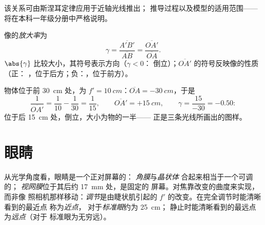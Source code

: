 \begin{remark}
该关系可由斯涅耳定律应用于近轴光线推出；
推导过程以及模型的适用范围——
将在本科一年级分册中严格说明。
\end{remark}

\begin{definition}[放大率]\label{def:g11:lenses-and-eye:magnification}
像的\emph{放大率}为
\[
\gamma = \frac{\overline{A'B'}}{\overline{AB}}
       = \frac{\overline{OA'}}{\overline{OA}} .
\]
$\abs{\gamma}$ 比较大小，其符号表示方向（$\gamma < 0$：
倒立）；$\overline{OA'}$ 的符号反映像的性质（正：
，位于后方；负：，位于前方）。
\end{definition}

\begin{example}[公式的应用]\label{ex:g11:lenses-and-eye:conjugate}
物体位于前 \qty{30}{cm} 处，为
$f' = \qty{10}{cm}$：$\overline{OA} = \qty{-30}{cm}$，于是
\[
\frac{1}{\overline{OA'}} = \frac{1}{10} - \frac{1}{30} = \frac{1}{15},
\qquad \overline{OA'} = +\qty{15}{cm},
\qquad \gamma = \frac{15}{-30} = -0.50 :
\]
位于后 \qty{15}{cm} 处，倒立，大小为物的一半——
正是三条光线所画出的图样。
\end{example}

\section{眼睛}

\begin{definition}[作为光学系统的眼睛]\label{def:g11:lenses-and-eye:eye}
从光学角度看，眼睛是一个正对屏幕的：
\emph{角膜}与\emph{晶状体}
合起来相当于一个可调的；
\emph{视网膜}位于其后约 \qty{17}{mm} 处，是固定的
屏幕。对焦靠改变的曲度来实现，而非像
照相机那样移动：\emph{调节}是由睫状肌引起的
$f'$ 的改变。在完全调节时能清晰看到的最近点
称为\emph{近点}，
对于\emph{标准眼}约为 \qty{25}{cm}；
静止时能清晰看到的最远点为\emph{远点}（对于
标准眼为无穷远）。
\end{definition}

